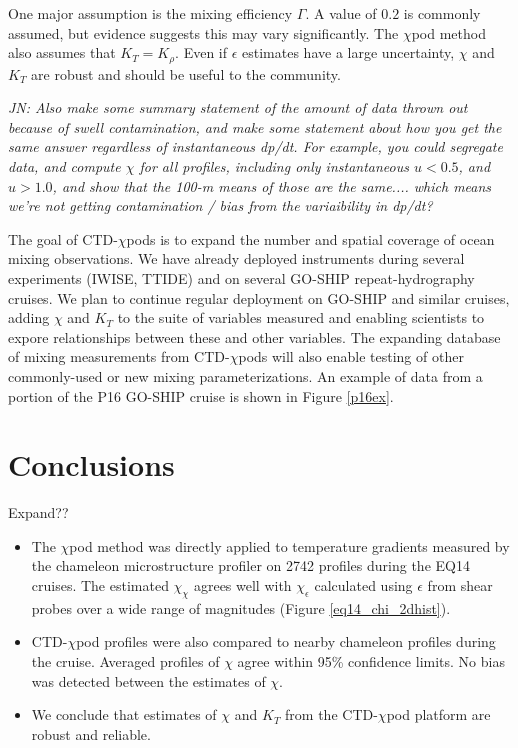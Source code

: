 \documentclass{ametsoc}
\begin{document}
 One major assumption is the mixing efficiency $\Gamma$. A value of $0.2$ is commonly assumed, but evidence suggests this may vary significantly. The $\chi$pod method also assumes that $K_T=K_{\rho}$. Even if $\epsilon$ estimates have a large uncertainty, $\chi$ and $K_T$ are robust and should be useful to the community.


{\em JN: Also make some summary statement of the amount of data thrown out because of swell contamination, and make some statement about how you get the same answer regardless of instantaneous dp/dt.  For example, you could segregate data, and compute $\chi$ for all profiles, including only instantaneous $u<0.5$, and $u>1.0$, and show that the 100-m means of those are the same.... which means we're not getting contamination / bias from the variaibility in dp/dt? 

}

The goal of CTD-$\chi$pods is to expand the number and spatial coverage of ocean mixing observations. We have already deployed instruments during several experiments (IWISE, TTIDE) and on several GO-SHIP repeat-hydrography cruises. We plan to continue regular deployment on GO-SHIP and similar cruises, adding $\chi$ and $K_T$ to the suite of variables measured and enabling scientists to expore relationships between these and other variables. The expanding database of mixing measurements from CTD-$\chi$pods will also enable testing of other commonly-used or new mixing parameterizations. An example of data from a portion of the P16 GO-SHIP cruise is shown in Figure \ref{p16ex}.



\section{Conclusions}

Expand??

\begin{itemize}
\item The $\chi$pod method was directly applied to temperature gradients measured by the chameleon microstructure profiler on 2742 profiles during the EQ14 cruises. The estimated $\chi_{\chi}$ agrees well with $\chi_{\epsilon}$ calculated using $\epsilon$ from shear probes over a wide range of magnitudes (Figure \ref{eq14_chi_2dhist}).
\item CTD-$\chi$pod profiles were also compared to nearby chameleon profiles during the cruise. Averaged profiles of $\chi$ agree within 95\% confidence limits. No bias was detected between the estimates of $\chi$.
\item We conclude that estimates of $\chi$ and $K_T$ from the CTD-$\chi$pod platform are robust and reliable.

\end{itemize}
\end{document}

